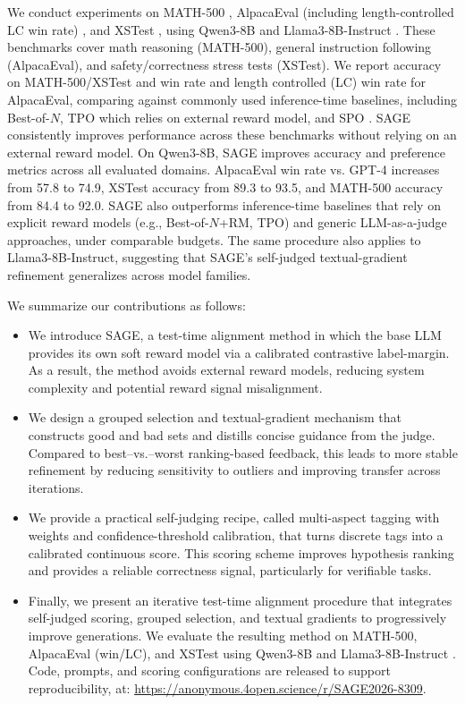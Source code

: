 \documentclass[11pt]{article}
\theoremstyle{plain}
\theoremstyle{definition}
\theoremstyle{remark}
\newcommand{\method}{SAGE}
\begin{document}
We conduct experiments on MATH-500 \citep{hendrycks2measuring}, AlpacaEval (including length-controlled LC win rate) \citep{dubois2024length}, and XSTest \citep{rottger2024xstest}, using Qwen3-8B \citep{yang2025qwen3} and Llama3-8B-Instruct \citep{grattafiori2024llama}. These benchmarks cover math reasoning (MATH-500), general instruction following (AlpacaEval), and safety/correctness stress tests (XSTest). We report accuracy on MATH-500/XSTest and win rate and length controlled (LC) win rate for AlpacaEval, comparing against commonly used inference-time baselines, including Best-of-\(N\), TPO \citep{litest} which relies on external reward model, and SPO \citep{xiang2025self}.
\method{} consistently improves performance across these benchmarks without relying on an external reward model. On Qwen3-8B, \method{} improves accuracy and preference metrics across all evaluated domains. AlpacaEval win rate vs. GPT-4 increases from 57.8 to 74.9, XSTest accuracy from 89.3 to 93.5, and MATH-500 accuracy from 84.4 to 92.0. \method{} also outperforms inference-time baselines that rely on explicit reward models (e.g., Best-of-\(N\)+RM, TPO) and generic LLM-as-a-judge approaches, under comparable budgets. The same procedure also applies to Llama3-8B-Instruct, suggesting that \method{}’s self-judged textual-gradient refinement generalizes across model families.


We summarize our contributions as follows:
\begin{itemize}
    \item We introduce \method{}, a test-time alignment method in which the base LLM provides its own soft reward model via a calibrated contrastive label-margin. As a result, the method avoids external reward models, reducing system complexity and potential reward signal misalignment.
    \item We design a grouped selection and textual-gradient mechanism that constructs good and bad sets and distills concise guidance from the judge. Compared to best–vs.–worst ranking-based feedback, this leads to more stable refinement by reducing sensitivity to outliers and improving transfer across iterations.
    \item We provide a practical self-judging recipe, called multi-aspect tagging with weights and confidence-threshold calibration, that turns discrete tags into a calibrated continuous score. This scoring scheme improves hypothesis ranking and provides a reliable correctness signal, particularly for verifiable tasks.
   
    \item Finally, we present an iterative test-time alignment procedure that integrates self-judged scoring, grouped selection, and textual gradients to progressively improve generations. We evaluate the resulting method on MATH-500, AlpacaEval (win/LC), and XSTest using Qwen3-8B \citep{yang2025qwen3} and Llama3-8B-Instruct \citep{grattafiori2024llama}. Code, prompts, and scoring configurations are released to support reproducibility, at: \url{https://anonymous.4open.science/r/SAGE2026-8309}.
\end{itemize}
\end{document}

